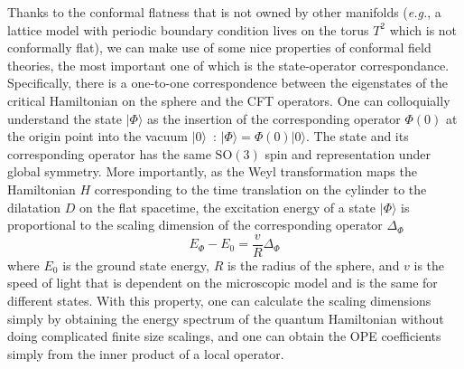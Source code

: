 \documentclass{timesjhep}
\begin{document}
Thanks to the conformal flatness that is not owned by other manifolds (\textit{e.g.}, a lattice model with periodic boundary condition lives on the torus $T^2$ which is not conformally flat), we can make use of some nice properties of conformal field theories, the most important one of which is the state-operator correspondance. Specifically, there is a one-to-one correspondence between the eigenstates of the critical Hamiltonian on the sphere and the CFT operators. One can colloquially understand the state $|\Phi\rangle$ as the insertion of the corresponding operator $\Phi(0)$ at the origin point into the vacuum $|0\rangle$~: $|\Phi\rangle=\Phi(0)|0\rangle$. The state and its corresponding operator has the same $\mathrm{SO}(3)$ spin and representation under global symmetry. More importantly, as the Weyl transformation maps the Hamiltonian $H$ corresponding to the time translation on the cylinder to the dilatation $D$ on the flat spacetime, the excitation energy of a state $|\Phi\rangle$ is proportional to the scaling dimension of the corresponding operator $\Delta_\Phi$ 
\begin{equation}
    E_\Phi-E_0=\frac{v}{R}\Delta_\Phi
\end{equation}
where $E_0$ is the ground state energy, $R$ is the radius of the sphere, and $v$ is the speed of light that is dependent on the microscopic model and is the same for different states. With this property, one can calculate the scaling dimensions simply by obtaining the energy spectrum of the quantum Hamiltonian without doing complicated finite size scalings, and one can obtain the OPE coefficients simply from the inner product of a local operator. 
\end{document}
